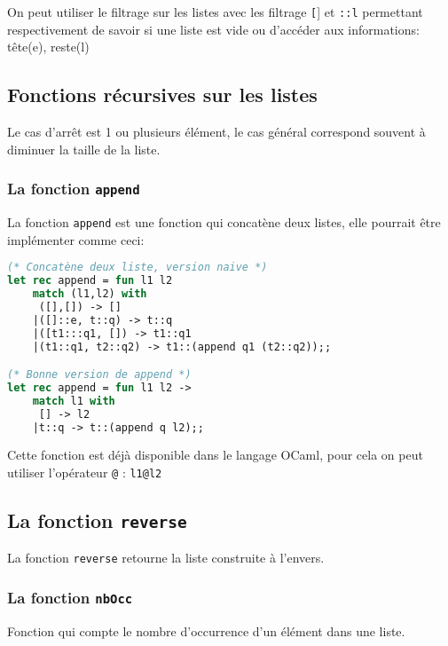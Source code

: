 	On peut utiliser le filtrage sur les listes avec les filtrage \texttt[] et \texttt{::l} permettant respectivement de savoir si une liste est vide ou
	d'accéder aux informations: tête(e), reste(l)

	\subsection{Fonctions récursives sur les listes}
	Le cas d'arrêt est 1 ou plusieurs élément, le cas général correspond souvent à diminuer la taille de la liste.



\subsubsection{La fonction \texttt{append}}
La fonction \texttt{append} est une fonction qui concatène deux listes, elle pourrait être implémenter comme ceci: 
\begin{lstlisting}[language=Caml, caption=Exemple d'implémentation de \texttt{append}]
(* Concatène deux liste, version naive *)
let rec append = fun l1 l2 
    match (l1,l2) with
     ([],[]) -> [] 
    |([]::e, t::q) -> t::q
    |([t1:::q1, []) -> t1::q1
    |(t1::q1, t2::q2) -> t1::(append q1 (t2::q2));;

(* Bonne version de append *)
let rec append = fun l1 l2 ->
    match l1 with
     [] -> l2
    |t::q -> t::(append q l2);;
\end{lstlisting}

\begin{remarque}
Cette fonction est déjà disponible dans le langage OCaml, pour cela on peut utiliser l'opérateur \texttt{@} : \texttt{l1@l2}
\end{remarque}

\subsection{La fonction \texttt{reverse}}
La fonction \texttt{reverse} retourne la liste construite à l'envers.


\subsubsection{La fonction \texttt{nbOcc}}
Fonction qui compte le nombre d'occurrence d'un élément dans une liste.

